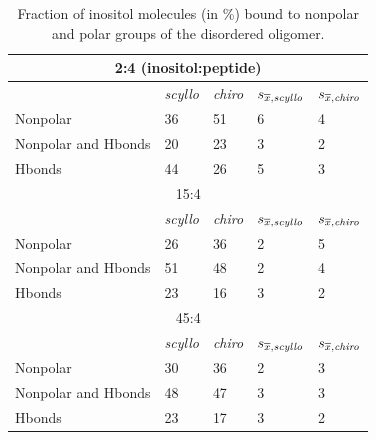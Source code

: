 \begin{table}[ht]
\centering 
\begin{tabular}{|l|llll|}
\hline
\multicolumn{5}{|c|}{2:4 (inositol:peptide)} \\ \hline
& \emph{scyllo} & \emph{chiro} & $s_{\overline{x}, \emph{scyllo}}$ & $s_{\overline{x}, \emph{chiro}}$ \\
\hline
Nonpolar & 36 & 51 & 6 & 4 \\ 
Nonpolar and Hbonds & 20 & 23 & 3 & 2 \\ 
Hbonds & 44 & 26 & 5 & 3 \\
\hline
\hline
\multicolumn{5}{|c|}{15:4} \\
\hline
& \emph{scyllo} & \emph{chiro} & $s_{\overline{x}, \emph{scyllo}}$ & $s_{\overline{x}, \emph{chiro}}$ \\
\hline
Nonpolar & 26 & 36 & 2 & 5 \\ 
Nonpolar and Hbonds & 51 & 48 & 2 & 4 \\ 
Hbonds & 23 & 16 & 3 & 2 \\
\hline
\hline
\multicolumn{5}{|c|}{45:4} \\
\hline
& \emph{scyllo} & \emph{chiro} & $s_{\overline{x}, \emph{scyllo}}$ & $s_{\overline{x}, \emph{chiro}}$ \\
\hline
Nonpolar & 30 & 36 & 2 & 3 \\ 
Nonpolar and Hbonds & 48 & 47 & 3 & 3 \\ 
Hbonds & 23 & 17 & 3 & 2 \\
\hline
\end{tabular}
\caption{Fraction of inositol molecules (in \%) bound to nonpolar and polar groups of the disordered oligomer.}    
\label{tbl:SI-disorderedBindingMode}
\end{table}


